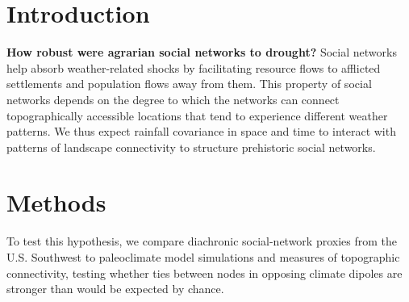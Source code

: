 \documentclass[a0,final]{a0poster}
\begin{document}
\begin{multicols}{3}							%
\raggedcolumns							%


\section*{Introduction}

\textbf{How robust were agrarian social networks to drought?} Social networks help absorb weather-related shocks by facilitating resource flows to afflicted settlements and population flows away from them. This property of social networks depends on the degree to which the networks can connect topographically accessible locations that tend to experience different weather patterns. We thus expect rainfall covariance in space and time to interact with patterns of landscape connectivity to structure prehistoric social networks.

\section*{Methods}
To test this hypothesis, we compare diachronic social-network proxies from the U.S. Southwest to paleoclimate model simulations and measures of topographic connectivity, testing whether ties between nodes in opposing climate dipoles are stronger than would be expected by chance.


\end{multicols}
\end{document}

